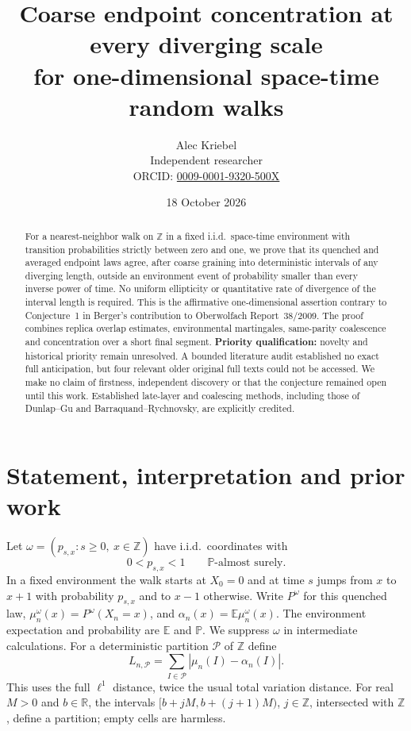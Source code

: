 \documentclass[11pt]{article}
\title{Coarse endpoint concentration at every diverging scale\\
for one-dimensional space-time random walks}
\author{Alec Kriebel\\
\small Independent researcher\\
\small ORCID: \href{https://orcid.org/0009-0001-9320-500X}{0009-0001-9320-500X}}
\date{18 October 2026}
\newcommand{\EE}{\mathbb E}
\newcommand{\PP}{\mathbb P}
\newcommand{\ZZ}{\mathbb Z}
\newcommand{\cP}{\mathcal P}
\begin{document}
\maketitle
\begin{abstract}
For a nearest-neighbor walk on $\ZZ$ in a fixed i.i.d.\ space-time
environment with transition probabilities strictly between zero and one,
we prove that its quenched and averaged endpoint laws agree, after
coarse graining into deterministic intervals of any diverging length,
outside an environment event of probability smaller than every inverse
power of time. No uniform ellipticity or quantitative rate of divergence
of the interval length is required. This is the affirmative
one-dimensional assertion contrary to Conjecture~1 in Berger's contribution
to Oberwolfach Report~38/2009. The proof combines replica overlap
estimates, environmental martingales, same-parity coalescence and
concentration over a short final segment.
\textbf{Priority qualification:} novelty and historical priority remain
unresolved. A bounded literature audit established no exact full
anticipation, but four relevant older original full texts could not be
accessed. We make no claim of firstness, independent discovery or that
the conjecture remained open until this work. Established late-layer
and coalescing methods, including those of Dunlap--Gu and
Barraquand--Rychnovsky, are explicitly credited.
\end{abstract}

\section{Statement, interpretation and prior work}

Let $\omega=(p_{s,x}:s\geq0,\ x\in\ZZ)$ have i.i.d.\ coordinates with
\begin{equation}\label{eq:ell}
             0<p_{s,x}<1\qquad\PP\text{-almost surely}.
\end{equation}
In a fixed environment the walk starts at $X_0=0$ and at time $s$ jumps
from $x$ to $x+1$ with probability $p_{s,x}$ and to $x-1$ otherwise.
Write $P^\omega$ for this quenched law,
$\mu_n^\omega(x)=P^\omega(X_n=x)$, and
$\alpha_n(x)=\EE\mu_n^\omega(x)$. The environment expectation and
probability are $\EE$ and $\PP$. We suppress $\omega$ in intermediate
calculations. For a deterministic partition $\cP$ of $\ZZ$ define
\[
 L_{n,\cP}=\sum_{I\in\cP}|\mu_n(I)-\alpha_n(I)|.
\]
This uses the full $\ell^1$ distance, twice the usual total variation
distance. For real $M>0$ and $b\in\mathbb R$, the intervals
$[b+jM,b+(j+1)M)$, $j\in\ZZ$, intersected with $\ZZ$, define a
partition; empty cells are harmless.
\end{document}
